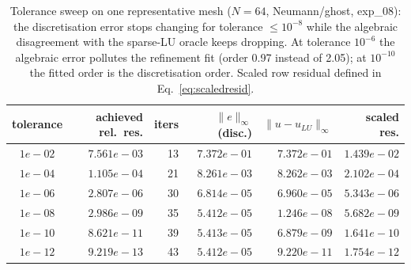\begin{table}[H]
\centering\small
\begin{tabular}{crrrrr}
\toprule
tolerance & achieved rel.\ res. & iters & $\lVert e\rVert_\infty$ (disc.) & $\lVert u-u_{LU}\rVert_\infty$ & scaled res. \\
\midrule
$1e-02$ & $7.561e-03$ & 13 & $7.372e-01$ & $7.372e-01$ & $1.439e-02$ \\
$1e-04$ & $1.105e-04$ & 21 & $8.261e-03$ & $8.262e-03$ & $2.102e-04$ \\
$1e-06$ & $2.807e-06$ & 30 & $6.814e-05$ & $6.960e-05$ & $5.343e-06$ \\
$1e-08$ & $2.986e-09$ & 35 & $5.412e-05$ & $1.246e-08$ & $5.682e-09$ \\
$1e-10$ & $8.621e-11$ & 39 & $5.413e-05$ & $6.879e-09$ & $1.641e-10$ \\
$1e-12$ & $9.219e-13$ & 43 & $5.412e-05$ & $9.220e-11$ & $1.754e-12$ \\
\bottomrule
\end{tabular}
\caption{Tolerance sweep on one representative mesh ($N=64$, Neumann/ghost, exp\_08): the discretisation error stops changing for tolerance $\le 10^{-8}$ while the algebraic disagreement with the sparse-LU oracle keeps dropping.  At tolerance $10^{-6}$ the algebraic error pollutes the refinement fit (order 0.97 instead of 2.05); at $10^{-10}$ the fitted order is the discretisation order.  Scaled row residual defined in Eq.~\eqref{eq:scaledresid}.}
\label{tab:tolsweep}
\end{table}